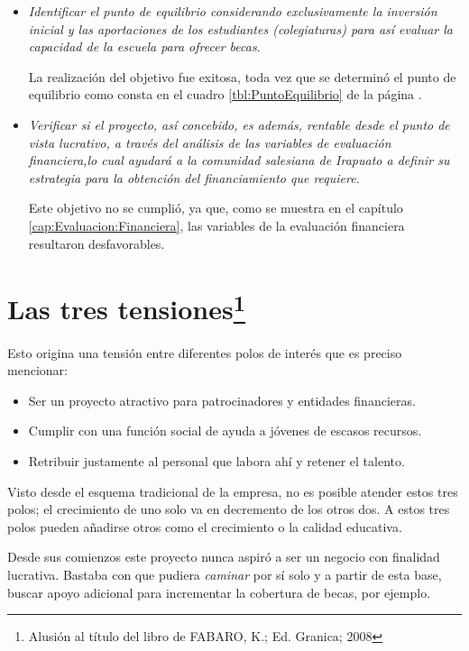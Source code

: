 \begin{itemize}
	\item \emph{Identificar el punto de equilibrio considerando exclusivamente la inversión inicial y las aportaciones de los estudiantes (colegiaturas) para así evaluar la capacidad de la escuela para ofrecer becas.}

		La realización del objetivo fue exitosa, toda vez que se determinó el punto de equilibrio como consta en el cuadro \ref{tbl:PuntoEquilibrio} de la página \pageref{tbl:PuntoEquilibrio}.

	\item \emph{Verificar si el proyecto, así concebido, es además, rentable desde el punto de vista lucrativo, a través del análisis de las variables de evaluación financiera,lo cual ayudará a la comunidad salesiana de Irapuato a definir su estrategia para la obtención del financiamiento que requiere}.

	Este objetivo no se cumplió, ya que, como se muestra en el capítulo \ref{cap:Evaluacion:Financiera}, las variables de la evaluación financiera resultaron desfavorables.

\end{itemize}

\section*{Las tres tensiones\footnote{Alusión al título del libro de FABARO, K.; Ed. Granica; 2008}}

Esto origina una tensión entre diferentes polos de interés que es preciso mencionar:

\begin{itemize}
	\item Ser un proyecto atractivo para patrocinadores y entidades financieras.
	\item Cumplir con una función social de ayuda a jóvenes de escasos recursos.
	\item Retribuir justamente al personal que labora ahí y retener el talento.
\end{itemize}

Visto desde el esquema tradicional de la empresa, no es posible atender estos tres polos; el crecimiento de uno solo va en decremento de los otros dos. A estos tres polos pueden añadirse otros como el crecimiento o la calidad educativa.

Desde sus comienzos este proyecto nunca aspiró a ser un negocio
con finalidad lucrativa.
Bastaba con que pudiera \emph{caminar} por sí solo y a partir de esta base, buscar apoyo adicional para incrementar la cobertura de becas, por ejemplo.

